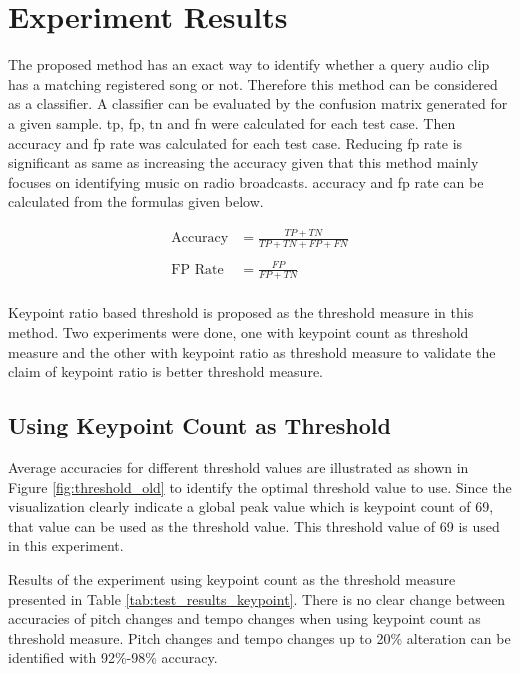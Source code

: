 \section{Experiment Results}
\label{section:results}

The proposed method has an exact way to identify whether a query audio clip has a matching registered song or not. Therefore this method can be considered as
a classifier. A classifier can be evaluated by the confusion matrix generated for a given sample. \ac{tp}, \ac{fp}, \ac{tn} and \ac{fn} were calculated
for each test case. Then accuracy and \ac{fp} rate was calculated for each test case. Reducing \ac{fp} rate is significant as same as increasing the accuracy
given that this method mainly focuses on identifying music on radio broadcasts. accuracy and \ac{fp} rate can be calculated from the formulas given below. 

\begin{align*}
    \text{Accuracy} &= \frac{TP+TN}{TP+TN+FP+FN}\\
    \\
    \text{FP Rate} &= \frac{FP}{FP+TN}\\
\end{align*}

Keypoint ratio based threshold is proposed as the threshold measure in this method. Two experiments were done, one with keypoint count as threshold measure and the
other with keypoint ratio as threshold measure to validate the claim of keypoint ratio is better threshold measure. 

\subsection{Using Keypoint Count as Threshold}

Average accuracies for different threshold values are illustrated as shown in Figure \ref{fig:threshold_old} to identify the optimal threshold value to use. Since
the visualization clearly indicate a global peak value which is keypoint count of 69, that value can be used as the threshold value. This threshold value of 69 is
used in this experiment. 
\vspace{12pt}

Results of the experiment using keypoint count as the threshold measure presented in Table \ref{tab:test_results_keypoint}. There is no clear
change between accuracies of pitch changes and tempo changes when using keypoint count as threshold measure. Pitch changes and tempo changes
up to 20\% alteration can be identified with 92\%-98\% accuracy. 


